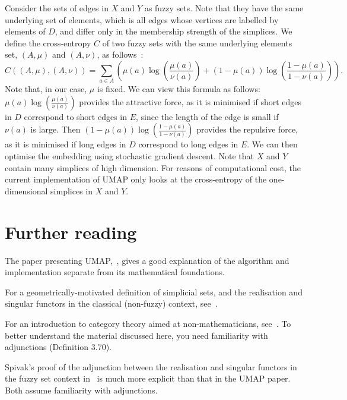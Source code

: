 \documentclass[a4paper,11pt,leqno]{article} \usepackage{amsmath}
\theoremstyle{definition}
\begin{document}
Consider the sets of edges in $X$ and $Y$ as fuzzy sets.
Note that they have
the same underlying set of elements, which is all edges whose vertices are
labelled by elements of $D$, and differ only in the membership strength of the
simplices.
We define the cross-entropy $C$ of two fuzzy sets with the same
underlying elements set, $(A, \mu)$ and $(A, \nu)$, as follows~\cite[Definition
10]{McInnes18}: $$C((A, \mu), (A, \nu)) = \sum_{a\in
A}\left(\mu(a)\log\left(\frac{\mu(a)}{\nu(a)}\right)
+ (1-\mu(a))\log\left(\frac{1-\mu(a)}{1-\nu(a)}\right)\right).$$ Note that, in
our case, $\mu$ is fixed.
We can view this formula as follows:
$\mu(a)\log\left(\frac{\mu(a)}{\nu(a)}\right)$ provides the attractive force, as
it is minimised if short edges in $D$ correspond to short edges in $E$, since
the length of the edge is small if $\nu(a)$ is large.
Then
$(1-\mu(a))\log\left(\frac{1-\mu(a)}{1-\nu(a)}\right)$ provides the repulsive
force, as it is minimised if long edges in $D$ correspond to long edges in $E$.
We can then optimise the embedding using stochastic gradient descent.
Note that
$X$ and $Y$ contain many simplices of high dimension.
For reasons of
computational cost, the current implementation of UMAP only looks at the
cross-entropy of the one-dimensional simplices in $X$ and $Y$.

\section{Further reading}

The paper presenting UMAP,~\cite{McInnes18}, gives a good explanation of the
algorithm and implementation separate from its mathematical foundations.

For a geometrically-motivated definition of simplicial sets, and the realisation
and singular functors in the classical (non-fuzzy) context,
see~\cite{Friedman08}.

For an introduction to category theory aimed at non-mathematicians,
see~\cite{Spivak18}.
To better understand the material discussed here, you need
familiarity with adjunctions (Definition 3.70).

Spivak's proof of the adjunction between the realisation and singular functors
in the fuzzy set context in~\cite{Spivak} is much more explicit than that in the
UMAP paper.
Both assume familiarity with adjunctions.
\end{document}
